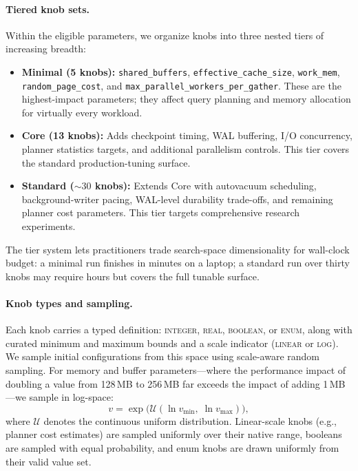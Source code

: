 \paragraph{Tiered knob sets.}
Within the eligible parameters, we organize knobs into three nested tiers of
increasing breadth:

\begin{itemize}
  \item \textbf{Minimal (5 knobs):} \texttt{shared\_buffers},
    \texttt{effective\_cache\_size}, \texttt{work\_mem},
    \texttt{random\_page\_cost}, and
    \texttt{max\_parallel\_workers\_per\_gather}.  These are the
    highest-impact parameters; they affect query planning and memory
    allocation for virtually every workload.
  \item \textbf{Core (13 knobs):} Adds checkpoint timing, WAL buffering,
    I/O concurrency, planner statistics targets, and additional parallelism
    controls.  This tier covers the standard production-tuning surface.
  \item \textbf{Standard (${\sim}30$ knobs):} Extends Core with autovacuum
    scheduling, background-writer pacing, WAL-level durability trade-offs,
    and remaining planner cost parameters.  This tier targets comprehensive
    research experiments.
\end{itemize}

The tier system lets practitioners trade search-space dimensionality for
wall-clock budget: a minimal run finishes in minutes on a laptop; a standard
run over thirty knobs may require hours but covers the full tunable surface.

\paragraph{Knob types and sampling.}
Each knob carries a typed definition: \textsc{integer}, \textsc{real},
\textsc{boolean}, or \textsc{enum}, along with curated minimum and maximum
bounds and a scale indicator (\textsc{linear} or \textsc{log}).  We sample
initial configurations from this space using scale-aware random sampling.
For memory and buffer parameters---where the performance impact of doubling a
value from 128\,MB to 256\,MB far exceeds the impact of adding 1\,MB---we
sample in log-space:
\begin{equation}
  v = \exp\!\bigl(\mathcal{U}(\ln v_{\min},\; \ln v_{\max})\bigr),
  \label{eq:log-sample}
\end{equation}
where $\mathcal{U}$ denotes the continuous uniform distribution.  Linear-scale
knobs (e.g., planner cost estimates) are sampled uniformly over their native
range, booleans are sampled with equal probability, and enum knobs are drawn
uniformly from their valid value set.

